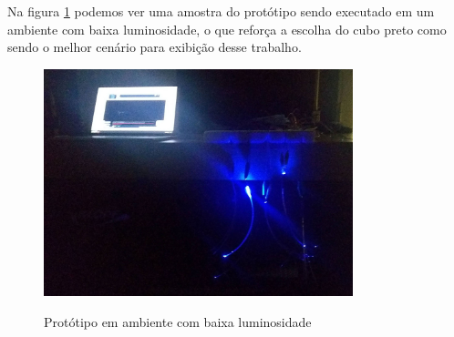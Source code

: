Na figura \ref{fig:prototipo-escuro} podemos ver uma amostra do protótipo sendo executado em um ambiente com baixa luminosidade, o que reforça a escolha do cubo preto como sendo o melhor cenário para exibição desse trabalho.
 
\begin{figure}[H]
    \centering
    \caption{Protótipo em ambiente com baixa luminosidade}
	\vspace*{0,2cm}
    \includegraphics[width=0.8\textwidth]{./04-figuras/prototipo_escuro}
    \label{fig:prototipo-escuro}
\end{figure}
\vspace*{-0,9cm}
{\raggedright {}}\\

   